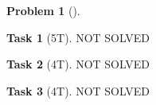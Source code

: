 \documentclass[11pt,twoside]{article}
\theoremstyle{definition}
\newtheorem{amsproblem}{Problem}
\newtheorem{amssubproblem}{Task}[amsproblem]
\newenvironment{problem}[1][]{%
  \begin{amsproblem}[#1]
  }{%
  \end{amsproblem}
}
\newenvironment{subproblem}[1][]{%
  \begin{amssubproblem}[#1]
  }{%
  \end{amssubproblem}
}
\newcommand{\TP}[1]{#1T}
\begin{document}
\noindent
\hrulefill

\begin{problem}
  \begin{subproblem}[\TP{5}]
    NOT SOLVED %
  \end{subproblem}
  \begin{subproblem}[\TP{4}]
    NOT SOLVED %
  \end{subproblem}
  \begin{subproblem}[\TP{4}]
    NOT SOLVED %
  \end{subproblem}
\end{problem}
\end{document}
